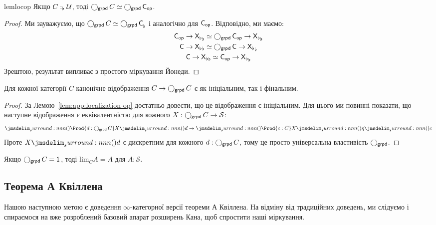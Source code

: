 \documentclass[12pt]{article}
\newcommand{\textcite}{\cite}
\newcommand{\Space}{\mathcal{S}}
\newcommand{\Equiv}{\mathrel{\simeq}}
\newcommand{\GM}{\flat}
\newcommand{\OM}{\mathsf{op}}
\let\prn\DelimPrn
\newcommand{\Lim}[1]{\mathrm{lim}_{#1}}
\begin{document}
\begin{restatable}{lem}{locop}
  \label{lem:app:localization-op}
  Якщо $\DeclVar{C}{\GM}{\Uni}$, тоді $\Grpdify{C} \Equiv \Grpdify{\Modify[\OM]{C}}$.
\end{restatable}
\begin{proof}
  Ми зауважуємо, що $\Grpdify{C} \Equiv \Modify[\GM]{\Grpdify{C}}$ і аналогічно для $\Modify[\OM]{C}$. Відповідно, ми маємо:
  \begin{gather*}
    \Modify[\GM]{
      \Modify[\OM]{C} \to \Modify[\GM]{X}
    }
    \Equiv
    \Modify[\GM]{
      \Grpdify{\Modify[\OM]{C}} \to \Modify[\GM]{X}
    }
    \\
    \Modify[\GM]{
      C \to \Modify[\GM]{X}
    }
    \Equiv
    \Modify[\GM]{
      \Grpdify{C} \to \Modify[\GM]{X}
    }
    \\
    \Modify[\GM]{
      C \to \Modify[\GM]{X}
    }
    \Equiv
    \Modify[\GM]{
      \Modify[\OM]{C} \to \Modify[\GM]{X}
    }
  \end{gather*}
  Зрештою, результат випливає з простого міркування Йонеди.
\end{proof}

\begin{lem}
  \label{lem:kan:localization-is-cofinal}
  Для кожної категорії $C$ канонічне відображення $C \to \operatorname{\bigcirc_{\mathsf{grpd}}}{C}$ є як ініціальним, так і фінальним.
\end{lem}
\begin{proof}
  За Лемою~\ref{lem:app:localization-op} достатньо довести, що це відображення є ініціальним. Для цього ми повинні показати, що наступне відображення є еквівалентністю для кожного $X : \Grpdify{C} \to \Space$:
  \[
    \prn{\Prod{d : \Grpdify{C}} X\prn{d}} \to \prn{\Prod{c : C} X\prn{\eta\prn{c}}}
  \]
  Проте $X\prn{d}$ є дискретним для кожного $d : \operatorname{\bigcirc_{\mathsf{grpd}}}{C}$, тому це просто універсальна властивість $\operatorname{\bigcirc_{\mathsf{grpd}}}$.
\end{proof}
\begin{cor}
  \label{lem:kan:limit-over-contractible}
  Якщо $\Grpdify{C} = \ObjTerm{}$, тоді $\Lim{C} A = A$ для $A : \Space$.
\end{cor}

\subsection{Теорема А Квіллена}
\label{sec:kan:quillen-a}

Нашою наступною метою є доведення $\infty$-категорної версії теореми А Квіллена. На відміну від традиційних доведень, ми слідуємо \textcite{ramzi:bousfield-kan} і спираємося на вже розроблений базовий апарат розширень Кана, щоб спростити наші міркування.
\end{document}
